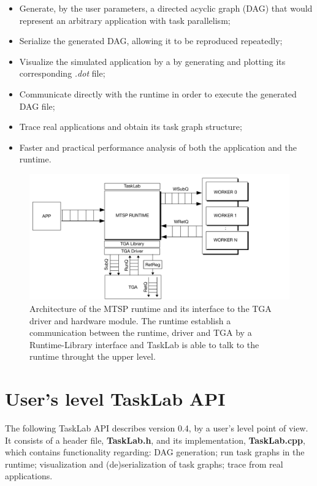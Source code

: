 \begin{itemize}
\item Generate, by the user parameters, a directed acyclic graph (DAG) that would represent an arbitrary application with task parallelism;
\item Serialize the generated DAG, allowing it to be reproduced repeatedly;
\item Visualize the simulated application by a by generating and plotting its corresponding \textit{.dot} file;
\item Communicate directly with the runtime in order to execute the generated DAG file;
\item Trace real applications and obtain its task graph structure;
\item Faster and practical performance analysis of both the application and the runtime.
\end{itemize}

\begin{figure}[ht!]
  \centering
  \includegraphics[width=12cm]{figures/MTSP-Driver.pdf}
  \caption{Architecture of the MTSP runtime and its interface to the TGA driver \cite{TIOGA} and hardware module. The runtime establish a communication between the runtime, driver and TGA by a Runtime-Library interface and TaskLab is able to talk to the runtime throught the upper level. }
  \label{fig:arch}
\end{figure}

\section{User's level TaskLab API}
The following TaskLab API describes version 0.4, by a user's level point of view. It consists of a header file, \textbf{TaskLab.h}, and its implementation, \textbf{TaskLab.cpp}, which contains functionality regarding: DAG generation; run task graphs in the runtime; visualization and (de)serialization of task graphs; trace from real applications.

